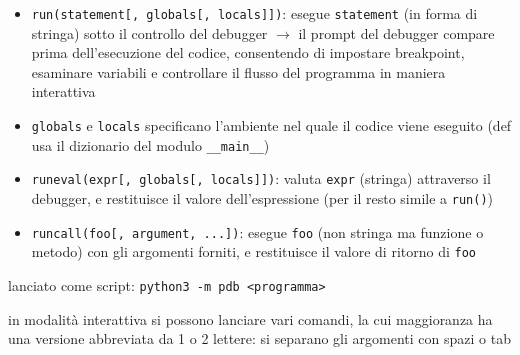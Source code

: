 \begin{itemize}
  \item \texttt{run(statement[, globals[, locals]])}: esegue \texttt{statement} (in forma di stringa) sotto il controllo del debugger $\rightarrow$ il prompt del debugger compare prima dell'esecuzione del codice, consentendo di impostare breakpoint, esaminare variabili e controllare il flusso del programma in maniera interattiva
  \item \texttt{globals} e \texttt{locals} specificano l'ambiente nel quale il codice viene eseguito (def usa il dizionario del modulo \texttt{__main__})
  \item \texttt{runeval(expr[, globals[, locals]])}: valuta \texttt{expr} (stringa) attraverso il debugger, e restituisce il valore dell'espressione (per il resto simile a \texttt{run()})
  \item \texttt{runcall(foo[, argument, ...])}: esegue \texttt{foo} (non stringa ma funzione o metodo) con gli argomenti forniti, e restituisce il valore di ritorno di \texttt{foo}
\end{itemize}

lanciato come script: \texttt{python3 -m pdb <programma>}

in modalit\`a interattiva si possono lanciare vari comandi, la cui maggioranza ha una versione abbreviata da 1 o 2 lettere: si separano gli argomenti con spazi o tab

